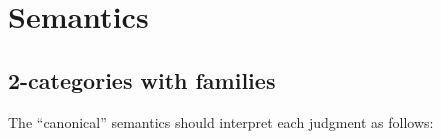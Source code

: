 \documentclass[10pt]{article}
\theoremstyle{definition}
\newcommand\dsd[1]{\ensuremath{\mathsf{#1}}}
\newcommand{\app}[2]{\ensuremath{#1 \: #2}}
\newcommand{\fst}[1]{\app{\dsd{fst}}{#1}}
\newcommand{\snd}[1]{\app{\dsd{snd}}{#1}}
\newcommand{\rewrite}[2]{\overleftarrow{#1}(#2)}
\newcommand\StI[2]{\ensuremath{\mathsf{st}_{#1}(#2)}}
\newcommand\StE[4]{\ensuremath{\mathsf{let} \, \StI{#1}{#3} \, = \, {#2} \, \mathsf{in} \, #4}}
\newcommand\FEs[4]{\ensuremath{\mathsf{let} \, \mathsf{F}_{#1}(#3) \, = \, {#2} \, \mathsf{in} \, #4}}
\newcommand\ApEl[2]{\mathcal{T}_{#1}\langle#2\rangle}
\newcommand{\upstairs}[1]{\overline{#1}}
\newcommand\One{\ensuremath{\mathds{1}}}
\newcommand\ApOne[1]{\ensuremath{\One_{\langle {#1} \rangle }}}
\newcommand\tsplit[1]{\ensuremath{\mathtt{split}_{#1}}}
\newcommand\qsplit[1]{\ensuremath{\mathsf{split}_{#1}}}
\begin{document}
\begin{enumerate}[style = multiline, labelwidth = 80pt]
%
%
\end{enumerate}

\section{Semantics}
\label{sec:semantics}

\subsection{2-categories with families}
\label{sec:2cwfs}

The ``canonical'' semantics should interpret each judgment as follows:
\end{document}
